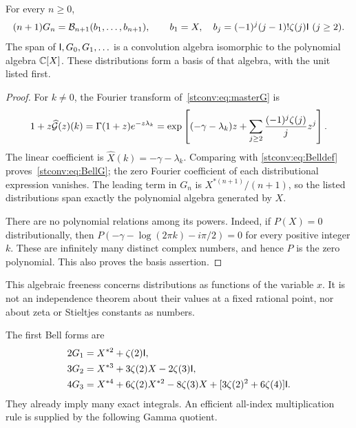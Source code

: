 \begin{theorem}\label{stconv:thm:Bell}
For every $n\ge0$,
\begin{equation}\label{stconv:eq:BellG}
 (n+1)G_n=\mathcal B_{n+1}(b_1,\ldots,b_{n+1}),\qquad
 b_1=X,\quad b_j=(-1)^j(j-1)!\zeta(j)\mathsf I\ (j\ge2).
\end{equation}
The span of $\mathsf I,G_0,G_1,\ldots$ is a convolution algebra isomorphic to
the polynomial algebra $\mathbb C[X]$. These distributions form a basis of that
algebra, with the unit listed first.
\end{theorem}
\begin{proof}
For $k\ne0$, the Fourier transform of~\eqref{stconv:eq:masterG} is
\[
 1+z\widehat{\mathcal G}(z)(k)
 =\Gamma(1+z)e^{-z\lambda_k}
 =\exp\left[(-\gamma-\lambda_k)z+
       \sum_{j\ge2}\frac{(-1)^j\zeta(j)}jz^j\right].
\]
The linear coefficient is
$\widehat X(k)=-\gamma-\lambda_k$. Comparing with
\eqref{stconv:eq:Belldef} proves~\eqref{stconv:eq:BellG}; the zero Fourier coefficient
of each distributional expression vanishes. The leading term in $G_n$
is $X^{*(n+1)}/(n+1)$, so the listed distributions span exactly the
polynomial algebra generated by $X$.

There are no polynomial relations among its powers. Indeed, if
$P(X)=0$ distributionally, then
$P(-\gamma-\log(2\pi k)-i\pi/2)=0$ for every positive integer $k$.
These are infinitely many distinct complex numbers, and hence $P$ is the
zero polynomial. This also proves the basis assertion.
\end{proof}

This algebraic freeness concerns distributions as functions of the
variable $x$. It is not an independence theorem about their values at a
fixed rational point, nor about zeta or Stieltjes constants as numbers.

The first Bell forms are
\begin{align}
 2G_1&=X^{*2}+\zeta(2)\mathsf I,\label{stconv:eq:Belllow}\\
 3G_2&=X^{*3}+3\zeta(2)X-2\zeta(3)\mathsf I,\notag\\
 4G_3&=X^{*4}+6\zeta(2)X^{*2}-8\zeta(3)X
                +[3\zeta(2)^2+6\zeta(4)]\mathsf I.\notag
\end{align}
They already imply many exact integrals. An efficient all-index
multiplication rule is supplied by the following Gamma quotient.

